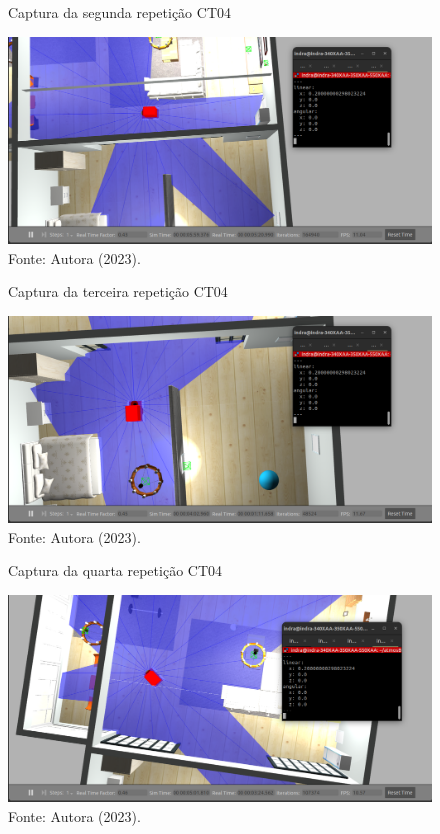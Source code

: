 \begin{figure}[H]
    \centering
    \caption{Captura da segunda repetição CT04}
    \includegraphics[scale=0.35]{ct04_2.png}
    \caption*{Fonte: Autora (2023).}
    \label{fig:ct04_2}
\end{figure}

\begin{figure}[H]
    \centering
    \caption{Captura da terceira repetição CT04}
    \includegraphics[scale=0.35]{ct04_3.png}
    \caption*{Fonte: Autora (2023).}
    \label{fig:ct04_3}
\end{figure}

\begin{figure}[H]
    \centering
    \caption{Captura da quarta repetição CT04}
    \includegraphics[scale=0.35]{ct04_4.png}
    \caption*{Fonte: Autora (2023).}
    \label{fig:ct04_4}
\end{figure}

